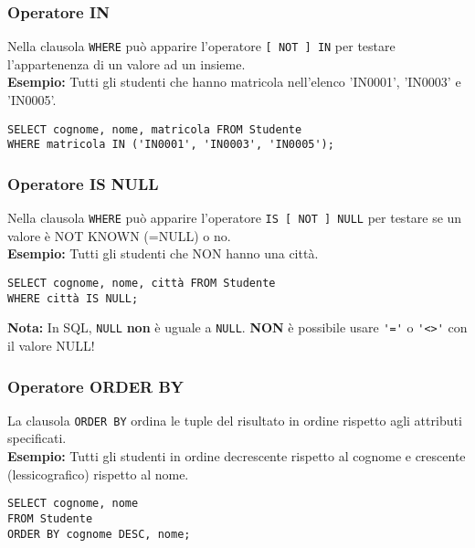 \documentclass[a4paper, 10pt, titlepage]{article}
\begin{document}
	\subsubsection{Operatore IN}
		Nella clausola \lstinline|WHERE| può apparire l’operatore \lstinline|[ NOT ] IN| per testare
		l’appartenenza di un valore ad un insieme. \medskip \\
		\textbf{Esempio: }Tutti gli studenti che hanno matricola nell’elenco 'IN0001', 'IN0003' e
		'IN0005'.
		\begin{lstlisting}
SELECT cognome, nome, matricola FROM Studente
WHERE matricola IN ('IN0001', 'IN0003', 'IN0005');
		\end{lstlisting}
	
	\subsubsection{Operatore IS NULL}
		Nella clausola \lstinline|WHERE| può apparire l’operatore \lstinline|IS [ NOT ] NULL| per testare
		se un valore è NOT KNOWN (=NULL) o no. \medskip \\
		\textbf{Esempio: }Tutti gli studenti che NON hanno una città.
\begin{lstlisting}
SELECT cognome, nome, città FROM Studente
WHERE città IS NULL;
\end{lstlisting}
	\textbf{Nota: }In SQL, \lstinline|NULL| \textbf{non} è uguale a \lstinline|NULL|.
	\textbf{NON} è possibile usare \lstinline|'='| o \lstinline|'<>'| con il valore NULL!
	
	\subsubsection{Operatore ORDER BY}
		La clausola \lstinline|ORDER BY| ordina le tuple del risultato in ordine rispetto agli
		attributi specificati. \medskip \\
		\textbf{Esempio: }Tutti gli studenti in ordine decrescente rispetto al cognome e crescente
		(lessicografico) rispetto al nome.
		\begin{lstlisting}
SELECT cognome, nome
FROM Studente
ORDER BY cognome DESC, nome;
		\end{lstlisting}
		\newpage
		
\end{document}
